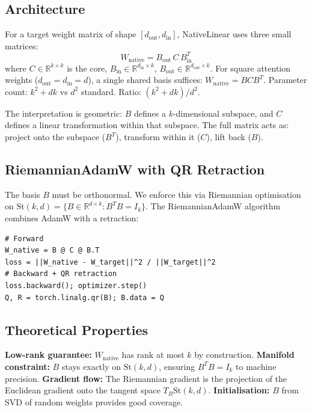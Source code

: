 \documentclass[11pt,a4paper]{article}
\begin{document}
\subsection{Architecture}
For a target weight matrix of shape $[d_{\mathrm{out}}, d_{\mathrm{in}}]$, NativeLinear uses three small matrices:
\begin{equation}
W_{\mathrm{native}} = B_{\mathrm{out}} \, C \, B_{\mathrm{in}}^T
\end{equation}
where $C \in \mathbb{R}^{k \times k}$ is the core, $B_{\mathrm{in}} \in \mathbb{R}^{d_{\mathrm{in}} \times k}$, $B_{\mathrm{out}} \in \mathbb{R}^{d_{\mathrm{out}} \times k}$. For square attention weights ($d_{\mathrm{out}} = d_{\mathrm{in}} = d$), a single shared basis suffices: $W_{\mathrm{native}} = B C B^T$. Parameter count: $k^2 + dk$ vs $d^2$ standard. Ratio: $(k^2 + dk)/d^2$.

The interpretation is geometric: $B$ defines a $k$-dimensional subspace, and $C$ defines a linear transformation within that subspace. The full matrix acts as: project onto the subspace ($B^T$), transform within it ($C$), lift back ($B$).

\subsection{RiemannianAdamW with QR Retraction}
The basis $B$ must be orthonormal. We enforce this via Riemannian optimisation on $\mathrm{St}(k,d) = \{B \in \mathbb{R}^{d \times k} : B^T B = I_k\}$. The RiemannianAdamW algorithm combines AdamW with a retraction:
\begin{verbatim}
# Forward
W_native = B @ C @ B.T
loss = ||W_native - W_target||^2 / ||W_target||^2
# Backward + QR retraction
loss.backward(); optimizer.step()
Q, R = torch.linalg.qr(B); B.data = Q
\end{verbatim}

\subsection{Theoretical Properties}
\textbf{Low-rank guarantee:} $W_{\mathrm{native}}$ has rank at most $k$ by construction. \textbf{Manifold constraint:} $B$ stays exactly on $\mathrm{St}(k,d)$, ensuring $B^T B = I_k$ to machine precision. \textbf{Gradient flow:} The Riemannian gradient is the projection of the Euclidean gradient onto the tangent space $T_B \mathrm{St}(k,d)$. \textbf{Initialisation:} $B$ from SVD of random weights provides good coverage.
\end{document}
